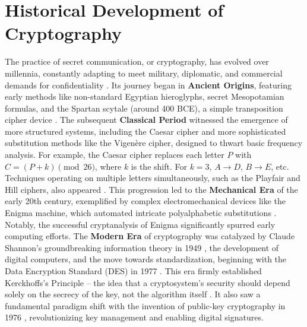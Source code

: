 \section{Historical Development of Cryptography}
The practice of secret communication, or cryptography, has evolved over millennia, constantly adapting to meet military, diplomatic, and commercial demands for confidentiality \parencite{kahn1996codebreakers, singh1999code}. Its journey began in \textbf{Ancient Origins}, featuring early methods like non-standard Egyptian hieroglyphs, secret Mesopotamian formulas, and the Spartan scytale (around 400 BCE), a simple transposition cipher device \parencite{madness2020classical}. The subsequent \textbf{Classical Period} witnessed the emergence of more structured systems, including the Caesar cipher and more sophisticated substitution methods like the Vigenère cipher, designed to thwart basic frequency analysis. For example, the Caesar cipher replaces each letter $P$ with $C = (P + k) \pmod{26}$, where $k$ is the shift. For $k=3$, $A \to D$, $B \to E$, etc. Techniques operating on multiple letters simultaneously, such as the Playfair and Hill ciphers, also appeared \parencite{singh1999code, stallings2017cryptography}. This progression led to the \textbf{Mechanical Era} of the early 20th century, exemplified by complex electromechanical devices like the Enigma machine, which automated intricate polyalphabetic substitutions \parencite{singh1999code}. Notably, the successful cryptanalysis of Enigma significantly spurred early computing efforts. The \textbf{Modern Era} of cryptography was catalyzed by Claude Shannon's groundbreaking information theory in 1949 \parencite{shannon1949communication}, the development of digital computers, and the move towards standardization, beginning with the Data Encryption Standard (DES) in 1977 \parencite{nist1999des}. This era firmly established Kerckhoffs's Principle – the idea that a cryptosystem's security should depend solely on the secrecy of the key, not the algorithm itself \parencite{kerckhoffs1883}. It also saw a fundamental paradigm shift with the invention of public-key cryptography in 1976 \parencite{diffie1976new}, revolutionizing key management and enabling digital signatures.

